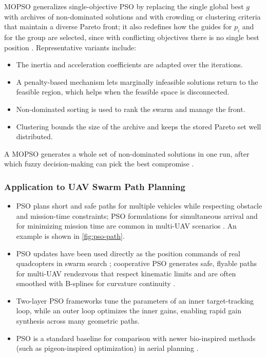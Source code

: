MOPSO generalizes single-objective PSO by replacing the single global best $g$
with archives of non-dominated solutions and with crowding or clustering
criteria that maintain a diverse Pareto front; it also redefines how the guides
for $p_i$ and for the group are selected, since with conflicting objectives there
is no single best position \cite{panigrahi2011handbook}. Representative variants
include:
\begin{itemize}
  \item {} The inertia and acceleration coefficients
        are adapted over the iterations.
  \item {} A penalty-based mechanism lets
        marginally infeasible solutions return to the feasible region, which
        helps when the feasible space is disconnected.
  \item {} Non-dominated sorting is used to
        rank the swarm and manage the front.
  \item {} Clustering bounds the size of the archive and keeps the
        stored Pareto set well distributed.
\end{itemize}
A MOPSO generates a whole set of non-dominated solutions in one run, after which
fuzzy decision-making can pick the best compromise \cite{panigrahi2011handbook}.

\subsubsection{Application to UAV Swarm Path Planning}

\begin{itemize}
  \item {} PSO plans short and safe paths for multiple vehicles
        while respecting obstacle and mission-time constraints; PSO formulations
        for simultaneous arrival and for minimizing mission time are common in
        multi-UAV scenarios \cite{he2021novel}. An example is shown in
        \cref{fig:pso-path}.
  \item {} PSO updates have been used
        directly as the position commands of real quadcopters in swarm search
        \cite{lee2018realtime}; cooperative PSO generates safe, flyable paths for
        multi-UAV rendezvous that respect kinematic limits and are often smoothed
        with B-splines for curvature continuity \cite{lin2022review}.
  \item {} Two-layer PSO frameworks tune the
        parameters of an inner target-tracking loop, while an outer loop
        optimizes the inner gains, enabling rapid gain synthesis across many
        geometric paths.
  \item {} PSO is a standard baseline for comparison with newer
        bio-inspired methods (such as pigeon-inspired optimization) in aerial
        planning \cite{tan2016handbook,lin2022review}.
\end{itemize}

